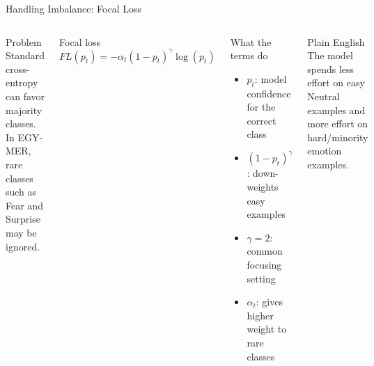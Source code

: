 \documentclass[aspectratio=169,10pt]{beamer}
\begin{document}
\begin{frame}[t]{Handling Imbalance: Focal Loss}
\begin{columns}[T,onlytextwidth]
\begin{alertblock}{Problem}
Standard cross-entropy can favor majority classes. In EGY-MER, rare classes such as Fear and Surprise may be ignored.
\end{alertblock}
\begin{block}{Focal loss}
\centering
\Large
$\displaystyle FL(p_t) = -\alpha_t(1-p_t)^\gamma\log(p_t)$
\end{block}
\begin{block}{What the terms do}
\begin{itemize}
  \item $p_t$: model confidence for the correct class
  \item $(1-p_t)^\gamma$: down-weights easy examples
  \item $\gamma = 2$: common focusing setting
  \item $\alpha_t$: gives higher weight to rare classes
\end{itemize}
\end{block}
\begin{exampleblock}{Plain English}
The model spends less effort on easy Neutral examples and more effort on hard/minority emotion examples.
\end{exampleblock}
\end{columns}
\end{frame}
\end{document}
